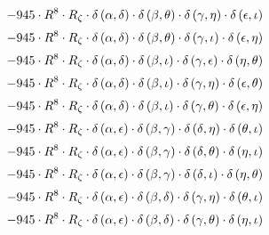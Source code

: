\begin{subequations}
\begin{gather}
 \\[0.2em] \notag 		 - 945 \cdot R^{8} \cdot R_{\zeta{}} \cdot \delta{}\left(\alpha{}, \delta{}\right) \cdot \delta{}\left(\beta{}, \theta{}\right) \cdot \delta{}\left(\gamma{}, \eta{}\right) \cdot \delta{}\left(\epsilon{}, \iota{}\right) 
 \\[0.2em] \notag 		 - 945 \cdot R^{8} \cdot R_{\zeta{}} \cdot \delta{}\left(\alpha{}, \delta{}\right) \cdot \delta{}\left(\beta{}, \theta{}\right) \cdot \delta{}\left(\gamma{}, \iota{}\right) \cdot \delta{}\left(\epsilon{}, \eta{}\right) 
 \\[0.2em] \notag 		 - 945 \cdot R^{8} \cdot R_{\zeta{}} \cdot \delta{}\left(\alpha{}, \delta{}\right) \cdot \delta{}\left(\beta{}, \iota{}\right) \cdot \delta{}\left(\gamma{}, \epsilon{}\right) \cdot \delta{}\left(\eta{}, \theta{}\right) 
 \\[0.2em] \notag 		 - 945 \cdot R^{8} \cdot R_{\zeta{}} \cdot \delta{}\left(\alpha{}, \delta{}\right) \cdot \delta{}\left(\beta{}, \iota{}\right) \cdot \delta{}\left(\gamma{}, \eta{}\right) \cdot \delta{}\left(\epsilon{}, \theta{}\right) 
 \\[0.2em] \notag 		 - 945 \cdot R^{8} \cdot R_{\zeta{}} \cdot \delta{}\left(\alpha{}, \delta{}\right) \cdot \delta{}\left(\beta{}, \iota{}\right) \cdot \delta{}\left(\gamma{}, \theta{}\right) \cdot \delta{}\left(\epsilon{}, \eta{}\right) 
 \\[0.2em] \notag 		 - 945 \cdot R^{8} \cdot R_{\zeta{}} \cdot \delta{}\left(\alpha{}, \epsilon{}\right) \cdot \delta{}\left(\beta{}, \gamma{}\right) \cdot \delta{}\left(\delta{}, \eta{}\right) \cdot \delta{}\left(\theta{}, \iota{}\right) 
 \\[0.2em] \notag 		 - 945 \cdot R^{8} \cdot R_{\zeta{}} \cdot \delta{}\left(\alpha{}, \epsilon{}\right) \cdot \delta{}\left(\beta{}, \gamma{}\right) \cdot \delta{}\left(\delta{}, \theta{}\right) \cdot \delta{}\left(\eta{}, \iota{}\right) 
 \\[0.2em] \notag 		 - 945 \cdot R^{8} \cdot R_{\zeta{}} \cdot \delta{}\left(\alpha{}, \epsilon{}\right) \cdot \delta{}\left(\beta{}, \gamma{}\right) \cdot \delta{}\left(\delta{}, \iota{}\right) \cdot \delta{}\left(\eta{}, \theta{}\right) 
 \\[0.2em] \notag 		 - 945 \cdot R^{8} \cdot R_{\zeta{}} \cdot \delta{}\left(\alpha{}, \epsilon{}\right) \cdot \delta{}\left(\beta{}, \delta{}\right) \cdot \delta{}\left(\gamma{}, \eta{}\right) \cdot \delta{}\left(\theta{}, \iota{}\right) 
 \\[0.2em] \notag 		 - 945 \cdot R^{8} \cdot R_{\zeta{}} \cdot \delta{}\left(\alpha{}, \epsilon{}\right) \cdot \delta{}\left(\beta{}, \delta{}\right) \cdot \delta{}\left(\gamma{}, \theta{}\right) \cdot \delta{}\left(\eta{}, \iota{}\right) 

\end{gather}
\end{subequations}
